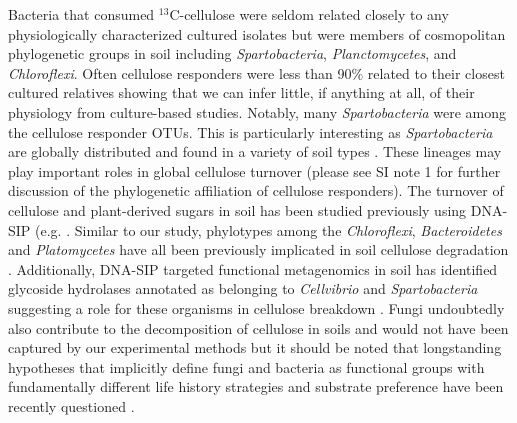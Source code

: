 Bacteria that consumed $^{13}$C-cellulose were seldom related closely to any
physiologically characterized cultured isolates but were members of
cosmopolitan phylogenetic groups in soil including \textit{Spartobacteria},
\textit{Planctomycetes}, and \textit{Chloroflexi}. Often cellulose responders
were less than 90\% related to their closest cultured relatives showing that we
can infer little, if anything at all, of their physiology from culture-based
studies. Notably, many \textit{Spartobacteria} were among the cellulose responder OTUs.
This is particularly interesting as \textit{Spartobacteria} are globally
distributed and found in a variety of soil types \citep{Bergmann_2011}. These lineages may play
important roles in global cellulose turnover (please see SI note 1 for further
discussion of the phylogenetic affiliation of cellulose responders). 
The turnover of cellulose and plant-derived sugars in soil has been studied
previously using DNA-SIP (e.g. \citep{Verastegui_2014}. Similar to our study,
phylotypes among the \textit{Chloroflexi}, \textit{Bacteroidetes} and
\textit{Platomycetes} have all been previously implicated in soil cellulose
degradation \citep{Schellenberger_2010}. Additionally, DNA-SIP targeted
functional metagenomics in soil has identified glycoside hydrolases annotated
as belonging to \textit{Cellvibrio} and \textit{Spartobacteria} suggesting a
role for these organisms in cellulose breakdown \citep{Verastegui_2014}. Fungi
undoubtedly also contribute to the decomposition of cellulose in soils \citep{boer_2005}
and would not have been captured by our experimental methods but it should be
noted that longstanding hypotheses that implicitly define fungi and bacteria as
functional groups with fundamentally different life history strategies and
substrate preference have been recently questioned \citep{rousk_2015}.

